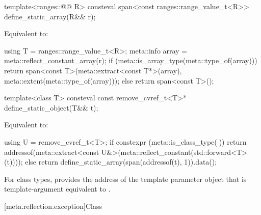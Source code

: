 %
\begin{itemdecl}
template<ranges::@@ R>
  consteval span<const ranges::range_value_t<R>> define_static_array(R&& r);
\end{itemdecl}

\begin{itemdescr}
\pnum
\effects
Equivalent to:
\begin{codeblock}
using T = ranges::range_value_t<R>;
meta::info array = meta::reflect_constant_array(r);
if (meta::is_array_type(meta::type_of(array))) {
  return span<const T>(meta::extract<const T*>(array), meta::extent(meta::type_of(array)));
} else {
  return span<const T>();
}
\end{codeblock}
\end{itemdescr}

%
\begin{itemdecl}
template<class T>
  consteval const remove_cvref_t<T>* define_static_object(T&& t);
\end{itemdecl}

\begin{itemdescr}
\pnum
\effects
Equivalent to:
\begin{codeblock}
using U = remove_cvref_t<T>;
if constexpr (meta::is_class_type(^^U)) {
  return addressof(meta::extract<const U&>(meta::reflect_constant(std::forward<T>(t))));
} else {
  return define_static_array(span(addressof(t), 1)).data();
}
\end{codeblock}

\pnum
\begin{note}
For class types,
 provides
the address of the template parameter object
that is template-argument equivalent to .
\end{note}
\end{itemdescr}

[meta.reflection.exception]{Class }

